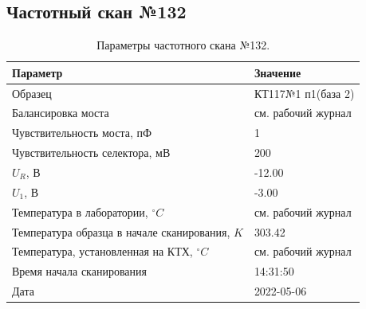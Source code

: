 \subsection{Частотный скан №132}
\begin{table}[!ht]
    \centering
    \caption{Параметры частотного скана №132.}
    \begin{tabular}{|l|l|}
        \hline
        Параметр                                       & Значение                  \\ \hline
        Образец                                        & КТ117№1 п1(база 2)        \\ \hline
        Балансировка моста                             & см. рабочий журнал        \\ \hline
        Чувствительность моста, пФ                     & 1                         \\ \hline
        Чувствительность селектора, мВ                 & 200                       \\ \hline
        $U_R$, В                                       & -12.00                    \\ \hline
        $U_1$, В                                       & -3.00                     \\ \hline
        Температура в лаборатории, $^\circ C$          & см. рабочий журнал        \\ \hline
        Температура образца в начале сканирования, $K$ & 303.42                    \\ \hline
        Температура, установленная на КТХ, $^\circ C$  & см. рабочий журнал        \\ \hline
        Время начала сканирования                      & 14:31:50                  \\ \hline
        Дата                                           & 2022-05-06                \\ \hline
    \end{tabular}
    \label{table:frequency_scan_132}
\end{table}

